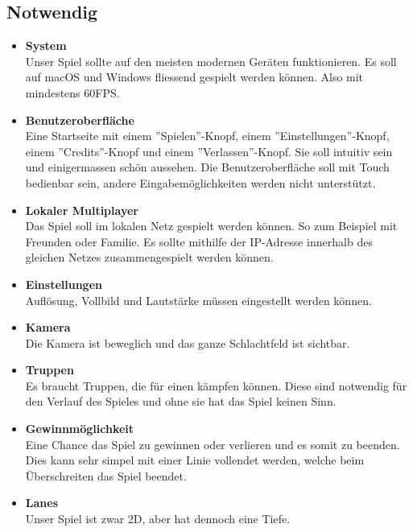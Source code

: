 \subsection*{Notwendig}
\begin{itemize}
    \item \textbf{System} \\
        Unser Spiel sollte auf den meisten modernen Geräten funktionieren. Es soll auf macOS und
        Windows fliessend gespielt werden können. Also mit mindestens 60FPS.
    \item \textbf{Benutzeroberfläche} \\
        Eine Startseite mit einem ''Spielen''-Knopf, einem ''Einstellungen''-Knopf, einem
        ''Credits''-Knopf und einem ''Verlassen''-Knopf. Sie soll intuitiv sein und einigermassen
        schön aussehen. Die Benutzeroberfläche soll mit Touch bedienbar sein, andere Eingabemöglichkeiten
        werden nicht unterstützt.
    \item \textbf{Lokaler Multiplayer} \\
        Das Spiel soll im lokalen Netz gespielt werden können. So zum Beispiel mit Freunden oder Familie.
        Es sollte mithilfe der IP-Adresse innerhalb des gleichen Netzes zusammengespielt werden können.
    \item \textbf{Einstellungen} \\
        Auflösung, Vollbild und Lautstärke müssen eingestellt werden können.
    \item \textbf{Kamera} \\
        Die Kamera ist beweglich und das ganze Schlachtfeld ist sichtbar.
    \item \textbf{Truppen} \\
        Es braucht Truppen, die für einen kämpfen können. Diese sind notwendig für den Verlauf des Spieles
        und ohne sie hat das Spiel keinen Sinn.
    \item \textbf{Gewinnmöglichkeit} \\
        Eine Chance das Spiel zu gewinnen oder verlieren und es somit zu beenden. Dies kann sehr simpel
        mit einer Linie vollendet werden, welche beim Überschreiten das Spiel beendet.
    \item \textbf{Lanes} \\
        Unser Spiel ist zwar 2D, aber hat dennoch eine Tiefe.
\end{itemize}

